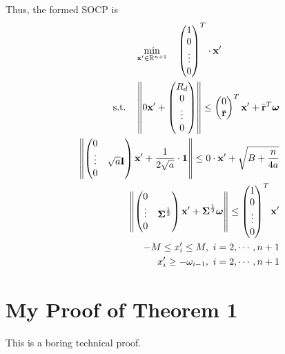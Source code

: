 \documentclass[12pt]{ftec2101}
\newcommand{\matr}[1]{\mathbf{#1}}
\newcommand{\vect}[1]{\mathbf{#1}}
\begin{document}
Thus, the formed SOCP is 
\begin{gather}
    \min_{\vect{x'} \in \mathbb{R}^{n+1}} \quad \begin{pmatrix}
        1 \\
        0 \\
        \vdots \\
        0
    \end{pmatrix}^T
    \cdot \vect{x'}\\
    \begin{aligned}
    \textup{s.t.} \quad  \left \Vert 0 \vect{x'} + 
    \begin{pmatrix}
        R_d\\
        0\\
        \vdots\\
        0
    \end{pmatrix} \right \Vert \leq
    \begin{pmatrix}
        0\\
        \bar{\vect{r}}
    \end{pmatrix}^T \vect{x'} + \bar{\vect{r}}^T \boldsymbol{\omega}\\
    \left \Vert 
    \begin{pmatrix}
        0 & \\
        \vdots & \sqrt{a} \matr{I} \\
        0 & 
    \end{pmatrix}\vect{x'} + \frac{1}{2\sqrt{a}} \cdot \vect{1} \right \Vert \leq 0 \cdot \vect{x'} + \sqrt{B+\frac{n}{4a}}\\
    \left \Vert
    \begin{pmatrix}
        0 & \\
        \vdots & \boldsymbol{\Sigma}^{\frac{1}{2}}\\
        0 & 
    \end{pmatrix} \vect{x'} + \boldsymbol{\Sigma}^{\frac{1}{2}} \boldsymbol{\omega} \right \Vert \leq
    \begin{pmatrix}
        1 \\
        0 \\
        \vdots \\
        0
    \end{pmatrix}^T \vect{x'}\\
    -M \leq x'_i \leq M,\ i=2,\cdots,n+1 \\
    x'_i \geq - \omega_{i - 1},\ i=2,\cdots,n+1
    \end{aligned}
\end{gather}


\appendix

\section{My Proof of Theorem 1}

This is a boring technical proof.
 
\end{document}
